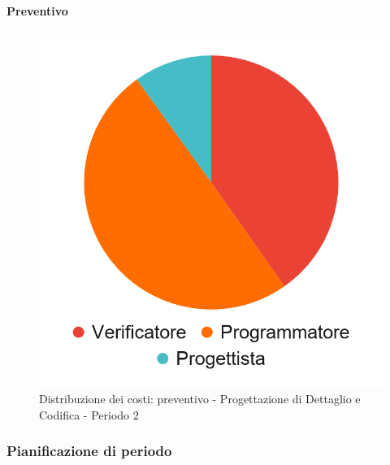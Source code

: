 \planningTable{
	
}

\paragraph{Preventivo}
\subparagraph*{}

\hspace{-1cm}
\begin{minipage}{.50\textwidth}
\smallPreventivoTable{
	
}
\end{minipage}
\hspace{1cm}
\begin{minipage}{.40\textwidth}
\begin{figure}[H]
	\includegraphics[scale=0.21]{res/images/charts/preventivo_priori/Grafico4-7.png}
	\caption{Distribuzione dei costi: preventivo - Progettazione di Dettaglio e Codifica - Periodo 2}
\end{figure}
\end{minipage} 




\subsubsection{Pianificazione di periodo}


